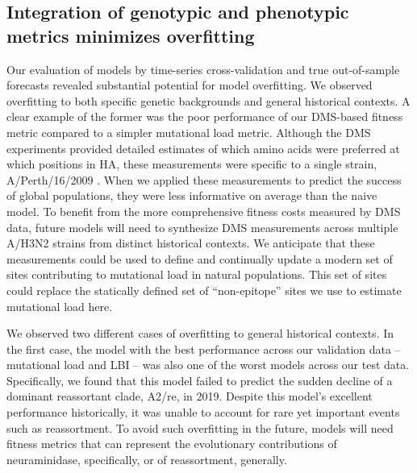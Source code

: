 \subsection*{Integration of genotypic and phenotypic metrics minimizes overfitting}

Our evaluation of models by time-series cross-validation and true out-of-sample forecasts revealed substantial potential for model overfitting.
We observed overfitting to both specific genetic backgrounds and general historical contexts.
A clear example of the former was the poor performance of our DMS-based fitness metric compared to a simpler mutational load metric.
Although the DMS experiments provided detailed estimates of which amino acids were preferred at which positions in HA, these measurements were specific to a single strain, A/Perth/16/2009 \cite{Lee2018}.
When we applied these measurements to predict the success of global populations, they were less informative on average than the naive model.
To benefit from the more comprehensive fitness costs measured by DMS data, future models will need to synthesize DMS measurements across multiple A/H3N2 strains from distinct historical contexts.
We anticipate that these measurements could be used to define and continually update a modern set of sites contributing to mutational load in natural populations.
This set of sites could replace the statically defined set of ``non-epitope'' sites we use to estimate mutational load here.

We observed two different cases of overfitting to general historical contexts.
In the first case, the model with the best performance across our validation data -- mutational load and LBI -- was also one of the worst models across our test data.
Specifically, we found that this model failed to predict the sudden decline of a dominant reassortant clade, A2/re, in 2019.
Despite this model's excellent performance historically, it was unable to account for rare yet important events such as reassortment.
To avoid such overfitting in the future, models will need fitness metrics that can represent the evolutionary contributions of neuraminidase, specifically, or of reassortment, generally.


